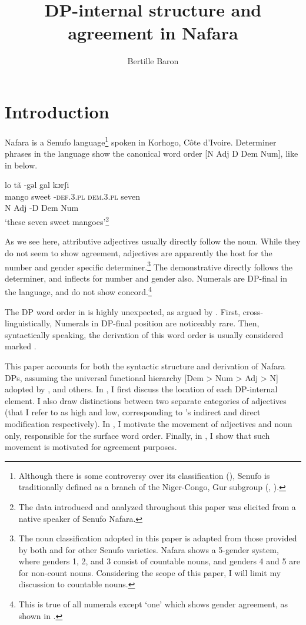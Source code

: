 \documentclass[output=paper]{langscibook}
\author{Bertille Baron\affiliation{Georgetown University}}
\title{DP-internal structure and agreement in Nafara}
\begin{document}
  

\section{Introduction}

Nafara is a Senufo language\footnote{Although there is some controversy over its classification (\citealt{Manessy1975,Naden1989}), Senufo is traditionally defined as a branch of the Niger-Congo, Gur subgroup (\citealt{Westermann1970}, \citealt{BendorSamuel1971}).} spoken in Korhogo, Côte d’Ivoire. Determiner phrases in the language show the canonical word order [N Adj D Dem Num], like in  below. 


\ea
\gll lo  tã -gəl  gal kɔrʃi \label{ex:baron:1}\\
      mango sweet -\textsc{def.3.pl} \textsc{dem.3.pl} seven\\
      N Adj -D Dem Num\\
\glt `these seven sweet mangoes'\footnote{The data introduced and analyzed throughout this paper was elicited from a native speaker of Senufo Nafara.}
\z

As we see here, attributive adjectives usually directly follow the noun. While they do not seem to show agreement, adjectives are apparently the host for the number and gender specific determiner.\footnote{The noun classification adopted in this paper is adapted from those provided by both \citet[22]{Manessy1996} and \citet[76]{Carlson1990} for other Senufo varieties. Nafara shows a 5-gender system, where genders 1, 2, and 3 consist of countable nouns, and genders 4 and 5 are for non-count nouns. Considering the scope of this paper, I will limit my discussion to countable nouns.} The demonstrative directly follows the determiner, and inflects for number and gender also. Numerals are DP-final in the language, and do not show concord.\footnote{This is true of all numerals except ‘one’ which shows gender agreement, as shown in .}

The DP word order in  is highly unexpected, as argued by \citet{Cinque2005}. First, cross-linguistically, Numerals in DP-final position are noticeably rare. Then, syntactically speaking, the derivation of this word order is usually considered marked \citep{Cinque2005}.

This paper accounts for both the syntactic structure and derivation of Nafara DPs, assuming the universal functional hierarchy [Dem > Num > Adj > N] adopted by \citet{Greenberg1963}, \citet{Cinque2005} and others. In , I first discuss the location of each DP-internal element. I also draw distinctions between two separate categories of adjectives (that I refer to as high and low, corresponding to \citealt{Cinque2010}’s  indirect and direct modification respectively). In , I motivate the movement of adjectives and noun only, responsible for the surface word order. Finally, in , I show that such movement is motivated for agreement purposes.
\end{document}
